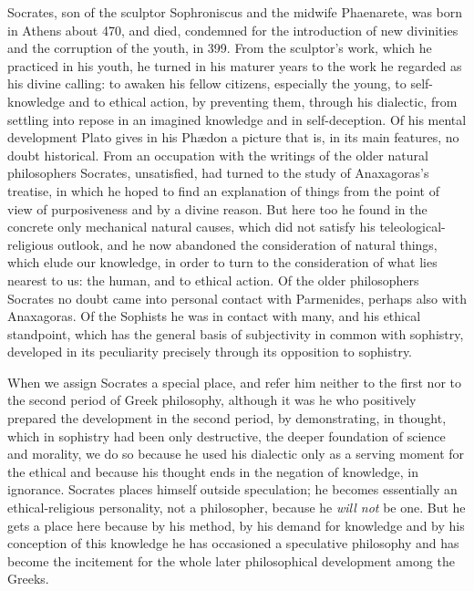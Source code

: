 Socrates, son of the sculptor Sophroniscus and the midwife
Phaenarete, was born in Athens about 470, and died, condemned for
the introduction of new divinities and the corruption of the youth, in 399.
From the sculptor's work, which he practiced in his youth,
he turned in his maturer years to the work he regarded as his divine calling: to awaken his fellow citizens, especially the young, to self-knowledge and to ethical action,
by preventing them, through his dialectic, from settling into
repose in an imagined knowledge and in self-deception. Of his mental
development Plato gives in his Phædon a picture that is, in its main features,
no doubt historical. From an occupation with the writings of the older natural
philosophers Socrates, unsatisfied, had turned
to the study of Anaxagoras's treatise, in which he hoped to
find an explanation of things from the point of view of purposiveness and by a divine reason. But here too he found
in the concrete only mechanical natural causes, which did not
satisfy his teleological-religious outlook, and he
now abandoned the consideration of natural things, which elude our
knowledge, in order to turn to the consideration of what lies
nearest to us: the human, and to ethical action. Of the
older philosophers Socrates no doubt came into personal contact with Parmenides, perhaps also with Anaxagoras. Of
the Sophists he was in contact with many, and his ethical
standpoint, which has the general basis of subjectivity in common with sophistry, developed in its peculiarity precisely through its opposition to sophistry.

When we assign Socrates a special place, and refer him
neither to the first nor to the second period of Greek
philosophy, although it was he who positively prepared the development in the second period, by demonstrating, in thought, which in
sophistry had been only destructive, the deeper foundation of science and morality, we do
so because he used his dialectic only as a serving moment for the ethical and because his thought ends in the negation of knowledge, in ignorance. Socrates places himself outside speculation; he becomes essentially an ethical-religious personality,
not a philosopher, because he \emph{will not} be one. But he gets
a place here because by his method, by his demand for
knowledge and by his conception of this knowledge he has occasioned a speculative philosophy and has become the incitement
for the whole later philosophical development among the Greeks.

